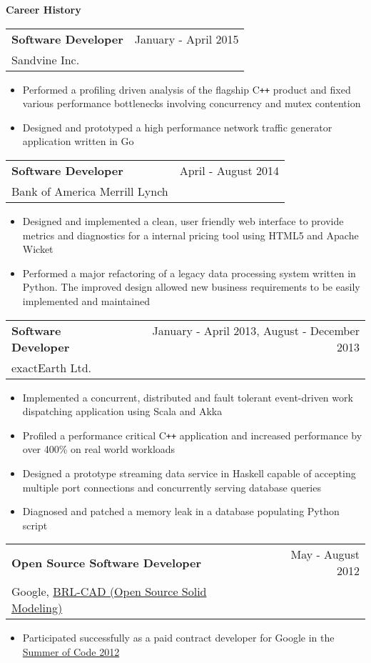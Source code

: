 \documentclass[10pt]{article}
\makeatletter
\newcommand{\resheading}[1]{{\large \colorbox{headercol}{\begin{minipage}{\textwidth}{\textbf{#1 \vphantom{p\^{E}}}}\end{minipage}}}}
\newcommand{\ressubheading}[3]{\item
\begin{tabular*}{7in}{l@{\extracolsep{\fill}}r}
    \textbf{#1} & #2 \\ #3
\end{tabular*}\vspace{-4pt}}
\makeatother
\begin{document}
\resheading{Career History}
\begin{description}
    \ressubheading{Software Developer} {January - April 2015} {Sandvine Inc.}
    \begin{itemize}
         \item{Performed a profiling driven analysis of the flagship C\texttt{++} product and fixed various performance bottlenecks involving concurrency and mutex contention}
         \item{Designed and prototyped a high performance network traffic generator application written in Go}
    \end{itemize}
    \ressubheading{Software Developer} {April - August 2014} {Bank of America Merrill Lynch}
    \begin{itemize}
        \item{Designed and implemented a clean, user friendly web interface to provide metrics and diagnostics for a internal pricing tool using HTML5 and Apache Wicket}
        \item{Performed a major refactoring of a legacy data processing system written in Python. The improved design allowed new business requirements to be easily implemented and maintained}
    \end{itemize}
    \ressubheading{Software Developer} {January - April 2013, August - December 2013} {exactEarth Ltd.}
    \begin{itemize}
        \item{Implemented a concurrent, distributed and fault tolerant event-driven work dispatching application using Scala and Akka}
        \item{Profiled a performance critical C\texttt{++} application and increased performance by over 400\% on real world workloads}
        \item{Designed a prototype streaming data service in Haskell capable of accepting multiple port connections and concurrently serving database queries}
        \item{Diagnosed and patched a memory leak in a database populating Python script}
    \end{itemize}
    \ressubheading{Open Source Software Developer} {May - August 2012} {Google, \href{http://brlcad.org}{BRL-CAD (Open Source Solid Modeling)}}
    \begin{itemize}
        \item{Participated successfully as a paid contract developer for Google in the \href{https://google-melange.appspot.com/gsoc/homepage/google/gsoc2012}{Summer of Code 2012}}

\end{itemize}
\end{description}
\end{document}

